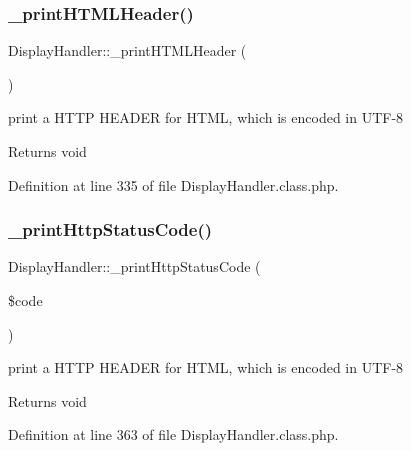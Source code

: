 \mbox{\label{classDisplayHandler_abbeb865d70e224403e99570c50d37f1b}} 
\subsubsection{\texorpdfstring{\+\_\+print\+H\+T\+M\+L\+Header()}{\_printHTMLHeader()}}
{\footnotesize\ttfamily Display\+Handler\+::\+\_\+print\+H\+T\+M\+L\+Header (\begin{DoxyParamCaption}{ }\end{DoxyParamCaption})}

print a H\+T\+TP H\+E\+A\+D\+ER for H\+T\+ML, which is encoded in U\+T\+F-\/8 \begin{DoxyReturn}{Returns}
void 
\end{DoxyReturn}


Definition at line 335 of file Display\+Handler.\+class.\+php.

\mbox{\label{classDisplayHandler_a1cdc46d8bb9a6dce319ecdc664c5748c}} 
\subsubsection{\texorpdfstring{\+\_\+print\+Http\+Status\+Code()}{\_printHttpStatusCode()}}
{\footnotesize\ttfamily Display\+Handler\+::\+\_\+print\+Http\+Status\+Code (\begin{DoxyParamCaption}\item[{}]{\$code }\end{DoxyParamCaption})}

print a H\+T\+TP H\+E\+A\+D\+ER for H\+T\+ML, which is encoded in U\+T\+F-\/8 \begin{DoxyReturn}{Returns}
void 
\end{DoxyReturn}


Definition at line 363 of file Display\+Handler.\+class.\+php.

\mbox{\label{classDisplayHandler_a62dd794125b2c76780ffdb9615abbb32}} 

